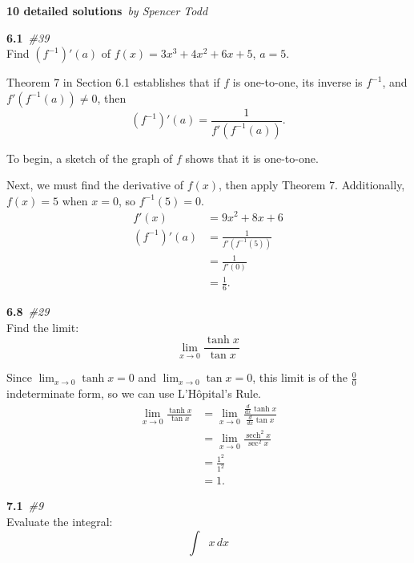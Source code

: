 \documentclass[10pt]{article}
\DeclareMathOperator{\sech}{sech}
\DeclareMathOperator{\invcos}{cos^{-1}}
\newcommand{\bfit}[2]{\textbf{#1}\ \textit{#2}}
\renewcommand{\title}[2]{\huge\bfit{#1}{#2}\normalsize}
\newcommand{\double}[0]{\par\null\par}
\renewcommand{\section}[2]{\double\LARGE\bfit{#1}{\##2}\normalsize\\}
\newcommand{\ddx}[0]{\frac{d}{dx}}
\newcommand{\paren}[1]{\left({#1}\right)}
\let\xint\int
\renewcommand{\int}[2]{\xint{#1}\,d#2}
\begin{document}
\selectfont
\title{10 detailed solutions}{by Spencer Todd}
\section{6.1}{39}
Find $\paren{f^{-1}}'\paren{a}$ of $f\paren{x}=3x^3+4x^2+6x+5$, $a=5$.\double

Theorem 7 in Section 6.1 establishes that if $f$ is one-to-one, its inverse is
$f^{-1}$, and $f'\paren{f^{-1}\paren{a}}\neq 0$, then
%
\begin{equation*}
\paren{f^{-1}}'\paren{a}=\frac{1}{f'\paren{f^{-1}\paren{a}}}.
\end{equation*}

To begin, a sketch of the graph of $f$ shows that it is one-to-one.
\vspace{1.5in}

Next, we must find the derivative of $f\paren{x}$, then apply Theorem 7. Additionally, $f\paren{x}=5$ when $x=0$, so
$f^{-1}\paren{5}=0$.
%
\begin{align*}
f'\paren{x}&=9x^2+8x+6 \\
%
\paren{f^{-1}}'\paren{a}&=\frac{1}{f'\paren{f^{-1}\paren{5}}} \\
&=\frac{1}{f'\paren{0}} \\
&=\frac{1}{6}.
\end{align*}

\section{6.8}{29}
Find the limit:
%
\begin{equation*}
\lim_{x\to 0}\frac{\tanh{x}}{\tan{x}}
\end{equation*}\double

Since $\displaystyle\lim_{x\to 0}\tanh{x}=0$ and $\displaystyle\lim_{x\to 0}\tan{x}=0$, this limit is of the
$\frac{0}{0}$ indeterminate form, so we can use L'H\^{o}pital's Rule.
%
\begin{align*}
\lim_{x\to 0}\frac{\tanh{x}}{\tan{x}}&=\lim_{x\to 0}\frac{\ddx\tanh{x}}{\ddx\tan{x}} \\
&=\lim_{x\to 0}\frac{\sech^2 x}{\sec^2 x} \\
&=\frac{1^2}{1^2} \\
&=1.
\end{align*}

\section{7.1}{9}
Evaluate the integral:
%
\begin{equation*}
\int{\invcos{x}}{x}
\end{equation*}\double
\end{document}
